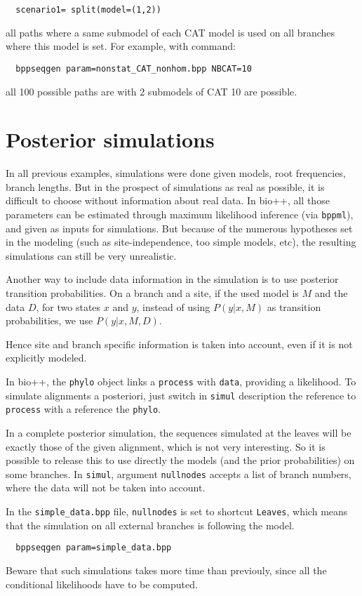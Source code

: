 \documentclass{article}
\begin{document}
\begin{verbatim}
  scenario1= split(model=(1,2))
\end{verbatim}

all paths where a same submodel of each CAT model is used on all
branches where this model is set. For example, with command:

\begin{verbatim}
  bppseqgen param=nonstat_CAT_nonhom.bpp NBCAT=10
\end{verbatim}

all 100 possible paths are with 2 submodels of CAT 10 are possible.

\section{Posterior simulations}

In all previous examples, simulations were done given models, root
frequencies, branch lengths. But in the prospect of simulations as
real as possible, it is difficult to choose without information about
real data. In bio++, all those parameters can be estimated through
maximum likelihood inference (via \texttt{bppml}), and given as inputs
for simulations. But because of the numerous hypotheses set in the
modeling (such as site-independence, too simple models, etc), the
resulting simulations can still be very unrealistic.

Another way to include data information in the simulation is to use
posterior transition probabilities. On a branch and a site, if the
used model is $M$ and the data $D$, for two states $x$ and $y$,
instead of using $P(y|x,M)$ as transition probabilities, we use
$P(y|x,M,D)$.

Hence site and branch specific information is taken into account, even
if it is not explicitly modeled.

In bio++, the \texttt{phylo} object links a \texttt{process} with
\texttt{data}, providing a likelihood. To simulate alignments
a posteriori, just switch in \texttt{simul} description the reference
to \texttt{process} with a reference the \texttt{phylo}.

In a complete posterior simulation, the sequences simulated at the
leaves will be exactly those of the given alignment, which is not very
interesting. So it is possible to release this to use directly the
models (and the prior probabilities) on some branches. In
\texttt{simul}, argument \texttt{nullnodes} accepts a list of branch
numbers, where the data will not be taken into account.

In the \verb|simple_data.bpp| file, \texttt{nullnodes} is set to
shortcut \texttt{Leaves}, which means that the simulation on all
external branches is following the model.

\begin{verbatim}
  bppseqgen param=simple_data.bpp
\end{verbatim}


Beware that such simulations takes more time than previouly, since all
the conditional likelihoods have to be computed.
\end{document}
